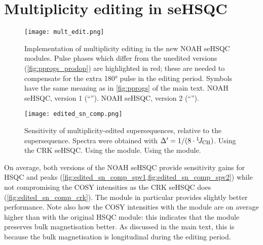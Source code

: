 \section{Multiplicity editing in seHSQC}

\begin{figure}
    \centering
    \texttt{[image: mult\_edit.png]}
    {\label{fig:mult_edit_spv1}}
    {\label{fig:mult_edit_spv2}}
    \caption{
        Implementation of multiplicity editing in the new NOAH seHSQC modules.
        Pulse phases which differ from the unedited versions (\cref{fig:pprogs_prodop}) are highlighted in red; these are needed to compensate for the extra \proton{} \ang{180} pulse in the editing period.
        Symbols have the same meaning as in \cref{fig:pprogs} of the main text.
        \textbf{} NOAH seHSQC, version 1 (``\noahSpa{}'').
        \textbf{} NOAH seHSQC, version 2 (``\noahSpb{}'').
    }
    \label{fig:mult_edit}
\end{figure}

\begin{figure}
    \centering
    \texttt{[image: edited\_sn\_comp.png]}
    {\label{fig:edited_sn_comp_crk}}
    {\label{fig:edited_sn_comp_spv1}}
    {\label{fig:edited_sn_comp_spv2}}
    \caption{
        Sensitivity of multiplicity-edited  supersequences, relative to the  supersequence.
        Spectra were obtained with $\Delta' = 1/(8\cdot\onejch)$.
        \textbf{} Using the CRK seHSQC.
        \textbf{} Using the \noahSpa{} module.
        \textbf{} Using the \noahSpb{} module.
        \andro{}
    }
    \label{fig:edited_sn_comp}
\end{figure}

On average, both versions of the NOAH seHSQC provide sensitivity gains for HSQC  and  peaks (\cref{fig:edited_sn_comp_spv1,fig:edited_sn_comp_spv2}) while not compromising the COSY intensities as the CRK seHSQC does (\cref{fig:edited_sn_comp_crk}).
The \noahSpb{} module in particular provides slightly better performance.
Note also how the COSY intensities with the \noahSpb{} module are on average higher than with the original HSQC module: this indicates that the \noahSpb{} module preserves bulk  magnetisation better.
As discussed in the main text, this is because the bulk magnetisation is longitudinal during the editing period.

